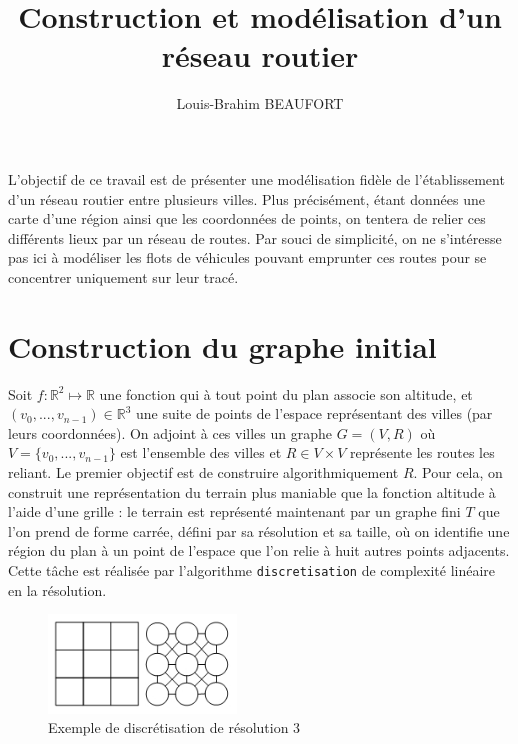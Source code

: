 \documentclass[french]{article}
\title{Construction et modélisation d'un réseau routier}
\author{Louis-Brahim BEAUFORT}
\begin{document}
  \maketitle

  L'objectif de ce travail est de présenter une modélisation fidèle de l'établissement d'un réseau routier entre plusieurs villes. Plus précisément, étant données une carte d'une région ainsi que les coordonnées de points, on tentera de relier ces différents lieux par un réseau de routes. Par souci de simplicité, on ne s'intéresse pas ici à modéliser les flots de véhicules pouvant emprunter ces routes pour se concentrer uniquement sur leur tracé.

	\section{Construction du graphe initial}

		Soit $f:\mathbb{R}^{2} \longmapsto \mathbb{R}$ une fonction qui à tout point du plan associe son altitude, et $(v_{0},...,v_{n-1}) \in \mathbb{R}^{3}$ une suite de points de l'espace représentant des villes (par leurs coordonnées). On adjoint à ces villes un graphe $G = (V,R)$ où $V=\{v_{0},...,v_{n-1}\}$ est l'ensemble des villes et $R \in V \times V$ représente les routes les reliant. Le premier objectif est de construire algorithmiquement $R$. \newline
		Pour cela, on construit une représentation du terrain plus maniable que la fonction altitude à l'aide d'une grille : le terrain est représenté maintenant par un graphe fini $T$ que l'on prend de forme carrée, défini par sa résolution et sa taille, où on identifie une région du plan à un point de l'espace que l'on relie à huit autres points adjacents. Cette tâche est réalisée par l'algorithme \verb?discretisation? de complexité linéaire en la résolution. \newline

		\begin{figure}[h]
			\centering
			\includegraphics[width=5cm]{Pics/Disc.jpg}
			\caption{Exemple de discrétisation de résolution 3}
		\end{figure}
\end{document}
